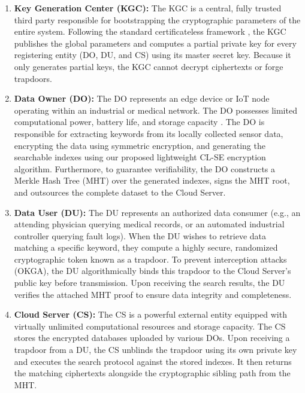 \documentclass[10pt,journal,compsoc]{IEEEtran}
\begin{document}
\begin{enumerate}
    \item \textbf{Key Generation Center (KGC):} The KGC is a central, fully trusted third party responsible for bootstrapping the cryptographic parameters of the entire system. Following the standard certificateless framework \cite{elhabob2020efficient}, the KGC publishes the global parameters and computes a partial private key for every registering entity (DO, DU, and CS) using its master secret key. Because it only generates partial keys, the KGC cannot decrypt ciphertexts or forge trapdoors.
    
    \item \textbf{Data Owner (DO):} The DO represents an edge device or IoT node operating within an industrial or medical network. The DO possesses limited computational power, battery life, and storage capacity \cite{liu2023pairing}. The DO is responsible for extracting keywords from its locally collected sensor data, encrypting the data using symmetric encryption, and generating the searchable indexes using our proposed lightweight CL-SE encryption algorithm. Furthermore, to guarantee verifiability, the DO constructs a Merkle Hash Tree (MHT) over the generated indexes, signs the MHT root, and outsources the complete dataset to the Cloud Server.
    
    \item \textbf{Data User (DU):} The DU represents an authorized data consumer (e.g., an attending physician querying medical records, or an automated industrial controller querying fault logs). When the DU wishes to retrieve data matching a specific keyword, they compute a highly secure, randomized cryptographic token known as a trapdoor. To prevent interception attacks (OKGA), the DU algorithmically binds this trapdoor to the Cloud Server's public key before transmission. Upon receiving the search results, the DU verifies the attached MHT proof to ensure data integrity and completeness.
    
    \item \textbf{Cloud Server (CS):} The CS is a powerful external entity equipped with virtually unlimited computational resources and storage capacity. The CS stores the encrypted databases uploaded by various DOs. Upon receiving a trapdoor from a DU, the CS unblinds the trapdoor using its own private key and executes the search protocol against the stored indexes. It then returns the matching ciphertexts alongside the cryptographic sibling path from the MHT.
\end{enumerate}
\end{document}
